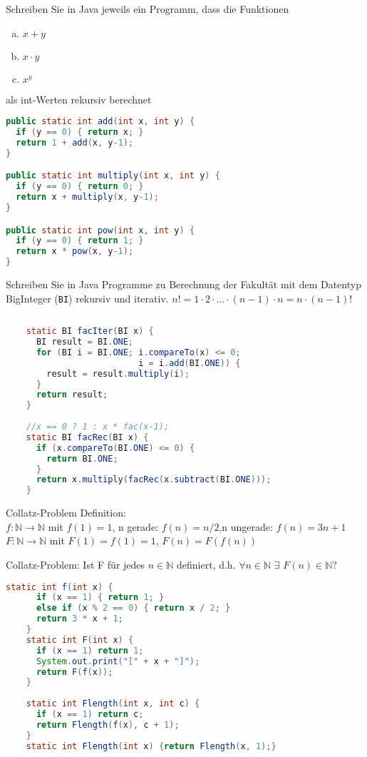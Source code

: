 \begin{card}
	Schreiben Sie in Java jeweils ein Programm, dass die Funktionen
	\begin{enumerate}[a)]
	\item $x+y$
	\item $x \cdot y$
	\item $x^y$
	\end{enumerate}
	als int-Werten rekursiv berechnet
	\hr
	\begin{lstlisting}[language=Java]
public static int add(int x, int y) {
  if (y == 0) { return x; }
  return 1 + add(x, y-1);
}

public static int multiply(int x, int y) {
  if (y == 0) { return 0; }
  return x + multiply(x, y-1);
}

public static int pow(int x, int y) {
  if (y == 0) { return 1; }
  return x * pow(x, y-1);
}
	\end{lstlisting}
\end{card}

\begin{card}
	Schreiben Sie in Java Programme zu Berechnung der Fakultät mit dem Datentyp BigInteger (\texttt{BI}) rekursiv und iterativ.
	\hr
	$n! = 1 \cdot 2 \cdot ... \cdot (n-1) \cdot n = n  \cdot  (n-1)!$
	\begin{lstlisting}[language=Java]
	
	static BI facIter(BI x) {
	  BI result = BI.ONE;
	  for (BI i = BI.ONE; i.compareTo(x) <= 0;
	                      i = i.add(BI.ONE)) {
	    result = result.multiply(i);
	  }
	  return result;
	}
	
	//x == 0 ? 1 : x * fac(x-1);
	static BI facRec(BI x) {
	  if (x.compareTo(BI.ONE) <= 0) {
	    return BI.ONE;
	  }
	  return x.multiply(facRec(x.subtract(BI.ONE)));
	}
	\end{lstlisting}
\end{card}

\begin{card}
	Collatz-Problem Definition:\\
	$f: \mathbb{N} \rightarrow \mathbb{N}$ mit
	$f(1) = 1$, n gerade: $f(n) = n / 2$,n ungerade: $f(n) = 3n + 1$\\
	$F: \mathbb{N} \rightarrow \mathbb{N}$ mit $F(1) = f(1)  = 1$, $F(n) = F(f(n))$

	Collatz-Problem: Ist F für jedes $n \in \mathbb{N}$  definiert, d.h. $\forall n \in \mathbb{N}$ $\exists$ $F(n) \in \mathbb{N}$?
	\hr
	\begin{lstlisting}[language=Java]
	static int f(int x) {
	  if (x == 1) { return 1; }
	  else if (x % 2 == 0) { return x / 2; }
	  return 3 * x + 1;
	}
	static int F(int x) {
	  if (x == 1) return 1;
	  System.out.print("[" + x + "]");
	  return F(f(x));
	}
	
	static int Flength(int x, int c) {
	  if (x == 1) return c;
	  return Flength(f(x), c + 1);
	}
	static int Flength(int x) {return Flength(x, 1);}
	\end{lstlisting}
\end{card}


